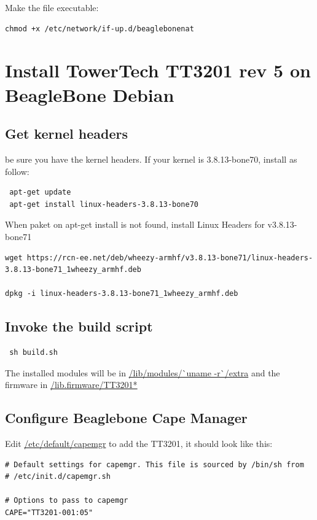 Make the file executable:
\begin{lstlisting}
chmod +x /etc/network/if-up.d/beaglebonenat
\end{lstlisting}


\section{Install TowerTech TT3201 rev 5 on BeagleBone Debian}

\subsection{Get kernel headers}
be sure you have the kernel headers. If your kernel is 3.8.13-bone70,
install as follow:

\begin{lstlisting}
 apt-get update
 apt-get install linux-headers-3.8.13-bone70
\end{lstlisting}

When paket on apt-get install is not found, install Linux Headers for v3.8.13-bone71

\begin{lstlisting}
wget https://rcn-ee.net/deb/wheezy-armhf/v3.8.13-bone71/linux-headers-3.8.13-bone71_1wheezy_armhf.deb 

dpkg -i linux-headers-3.8.13-bone71_1wheezy_armhf.deb 
\end{lstlisting}

\subsection{Invoke the build script}
\begin{lstlisting}
 sh build.sh
 \end{lstlisting}

The installed modules will be in \url{/lib/modules/`uname -r`/extra} and the firmware in \url{/lib.firmware/TT3201*}

\subsection{Configure Beaglebone Cape Manager}
Edit \url{/etc/default/capemgr} to add the TT3201, it should look like this:

\begin{lstlisting}
# Default settings for capemgr. This file is sourced by /bin/sh from
# /etc/init.d/capemgr.sh

# Options to pass to capemgr
CAPE="TT3201-001:05"
\end{lstlisting}


